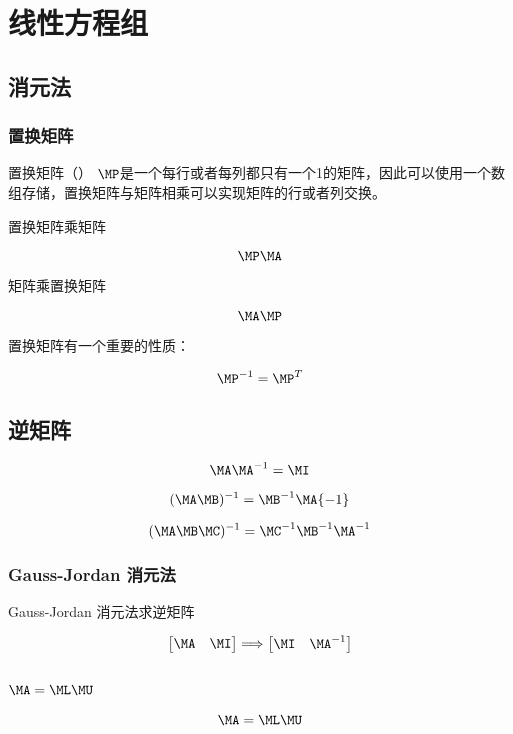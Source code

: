\chapter{线性方程组}

\section{消元法} 


\subsection{置换矩阵} 

置换矩阵（） $\MP$是一个每行或者每列都只有一个1的矩阵，因此可以使用一个数组存储，置换矩阵与矩阵相乘可以实现矩阵的行或者列交换。

 置换矩阵乘矩阵

$$\MP \MA$$

 矩阵乘置换矩阵

$$\MA \MP$$

置换矩阵有一个重要的性质：

$$\MP^{-1} = \MP^{T}$$

\section{逆矩阵}

$$\MA \MA^{-1} = \MI$$

$$(\MA \MB)^{-1} = \MB^{-1}\MA{-1}$$

$$(\MA \MB \MC)^{-1} = \MC^{-1}\MB^{-1}\MA^{-1}$$

\subsection{Gauss-Jordan 消元法}

Gauss-Jordan 消元法求逆矩阵

\begin{equation}
    \begin{bmatrix}
       \MA & \MI
    \end{bmatrix} 
    \Longrightarrow
    \begin{bmatrix}
        \MI & \MA^{-1}
    \end{bmatrix} 
\end{equation}

\section{$\MA = \ML\MU$}


$$\MA = \ML\MU$$
